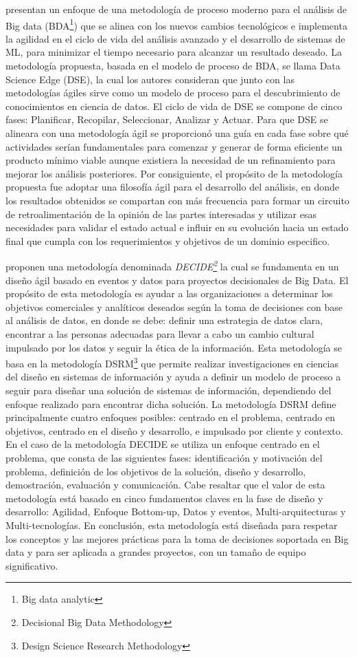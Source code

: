 \cite{Grady2017} presentan un enfoque de una metodología de proceso moderno para el análisis de Big data (BDA\footnote{Big data analytic}) que se alinea con los nuevos cambios tecnológicos e implementa la agilidad en el ciclo de vida del análisis avanzado y el desarrollo de sistemas de ML, para minimizar el tiempo necesario para alcanzar un resultado deseado. La metodología propuesta, basada en el modelo de proceso de BDA, se llama Data Science Edge (DSE), la cual los autores consideran que junto con las metodologías ágiles sirve como un modelo de proceso para el descubrimiento de conocimientos en ciencia de datos. El ciclo de vida de DSE se compone de cinco fases: Planificar, Recopilar, Seleccionar, Analizar y Actuar. Para que DSE se alineara con una metodología ágil se proporcionó una guía en cada fase sobre qué actividades serían fundamentales para comenzar y generar de forma eficiente un producto mínimo viable aunque existiera la necesidad de un refinamiento para mejorar los análisis posteriores. Por consiguiente, el propósito de la metodología propuesta fue adoptar una filosofía ágil para el desarrollo del análisis, en donde los resultados obtenidos se compartan con más frecuencia para formar un circuito de retroalimentación de la opinión de las partes interesadas y utilizar esas necesidades para validar el estado actual e influir en su evolución hacia un estado final que cumpla con los requerimientos y objetivos de un dominio especifico.

\cite{Sfaxi2020} proponen una metodología denominada \textit{DECIDE\footnote{Decisional Big Data Methodology}} la cual se fundamenta en un diseño ágil basado en eventos y datos para proyectos decisionales de Big Data. El propósito de esta metodología es ayudar a las organizaciones a determinar los objetivos comerciales y analíticos deseados según la toma de decisiones con base al análisis de datos, en donde se debe: definir una estrategia de datos clara, encontrar a las personas adecuadas para llevar a cabo un cambio cultural impulsado por los datos y seguir la ética de la información. Esta metodología se basa en la metodología DSRM\footnote{Design Science Research Methodology} que permite realizar investigaciones en ciencias del diseño en sistemas de información y ayuda a definir un modelo de proceso a seguir para diseñar una solución de sistemas de información, dependiendo del enfoque realizado para encontrar dicha solución. La metodología DSRM define principalmente cuatro enfoques posibles: centrado en el problema, centrado en objetivos, centrado en el diseño y desarrollo, e impulsado por cliente y contexto. En el caso de la metodología DECIDE se utiliza un enfoque centrado en el problema, que consta de las siguientes fases: identificación y motivación del problema, definición de los objetivos de la solución, diseño y desarrollo, demostración, evaluación y comunicación. Cabe resaltar que el valor de esta metodología está basado en cinco fundamentos claves en la fase de diseño y desarrollo: Agilidad, Enfoque Bottom-up, Datos y eventos, Multi-arquitecturas y Multi-tecnologías. En conclusión, esta metodología está diseñada para respetar los conceptos y las mejores prácticas para la toma de decisiones soportada en Big data y para ser aplicada a grandes proyectos, con un tamaño de equipo significativo. 

